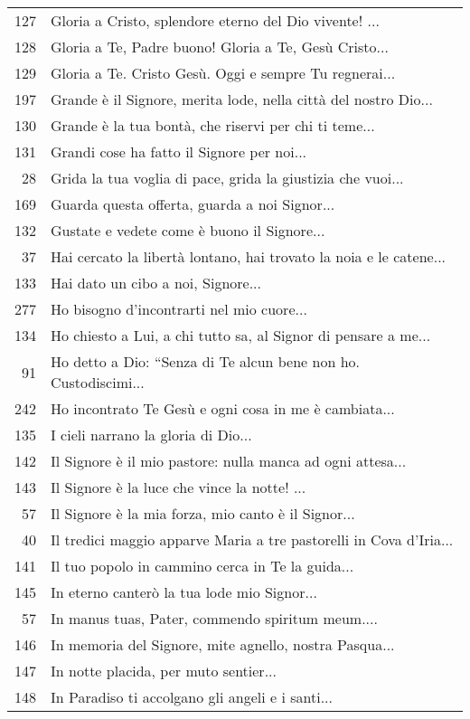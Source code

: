 {\begin{flushleft}
\begin{longtable}{r m{11cm}}
    127 & Gloria a Cristo, splendore eterno del Dio vivente! ...\\
    128 & Gloria a Te, Padre buono! Gloria a Te, Gesù Cristo...\\
    129 & Gloria a Te. Cristo Gesù. Oggi e sempre Tu regnerai...\\
    197 & Grande è il Signore, merita lode, nella città del nostro Dio...\\
    130 & Grande è la tua bontà, che riservi per chi ti teme...\\
    131 & Grandi cose ha fatto il Signore per noi...\\
    28 & Grida la tua voglia di pace, grida la giustizia che vuoi...\\
    169 & Guarda questa offerta, guarda a noi Signor...\\
    132 & Gustate e vedete come è buono il Signore...\\
    37 & Hai cercato la libertà lontano, hai trovato la noia e le catene...\\
    133 & Hai dato un cibo a noi, Signore...\\
    277 & Ho bisogno d'incontrarti nel mio cuore...\\
    134 & Ho chiesto a Lui, a chi tutto sa, al Signor di pensare a me...\\
    91 & Ho detto a Dio: ``Senza di Te alcun bene non ho. Custodiscimi...\\
    242 & Ho incontrato Te Gesù e ogni cosa in me è cambiata...\\
    135 & I cieli narrano la gloria di Dio...\\
    142 & Il Signore è il mio pastore: nulla manca ad ogni attesa...\\
    143 & Il Signore è la luce che vince la notte! ...\\
    57 & Il Signore è la mia forza, mio canto è il Signor...\\
    40 & Il tredici maggio apparve Maria a tre pastorelli in Cova d'Iria...\\
    141 & Il tuo popolo in cammino cerca in Te la guida...\\
    145 & In eterno canterò la tua lode mio Signor...\\
    57 & In manus tuas, Pater, commendo spiritum meum....\\
    146 & In memoria del Signore, mite agnello, nostra Pasqua...\\
    147 & In notte placida, per muto sentier...\\
    148 & In Paradiso ti accolgano gli angeli e i santi...\\

\end{longtable}
\end{flushleft}}
